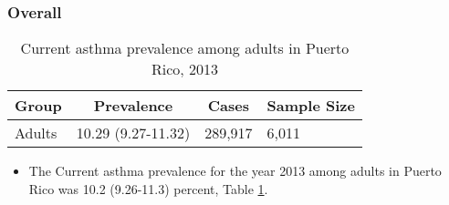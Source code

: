 






\subsubsection{Overall}




\begin{table}[H]
\caption{Current asthma prevalence among adults in Puerto Rico, 2013\label{tab:Overall.tabl.Asthma.2013}} 
\begin{center}
\begin{tabular}{llll}
\hline\hline
\multicolumn{1}{l}{Group}&\multicolumn{1}{c}{Prevalence}&\multicolumn{1}{c}{Cases}&\multicolumn{1}{c}{Sample Size}\tabularnewline
\hline
Adults&10.29 (9.27-11.32)&289,917&6,011\tabularnewline
\hline
\end{tabular}\end{center}

\end{table}




\begin{itemize}


\item The Current asthma prevalence for the year 2013 among adults in Puerto Rico was 10.2 (9.26-11.3) percent, 
Table \ref{tab:Overall.tabl.Asthma.2013}.

\end{itemize}


